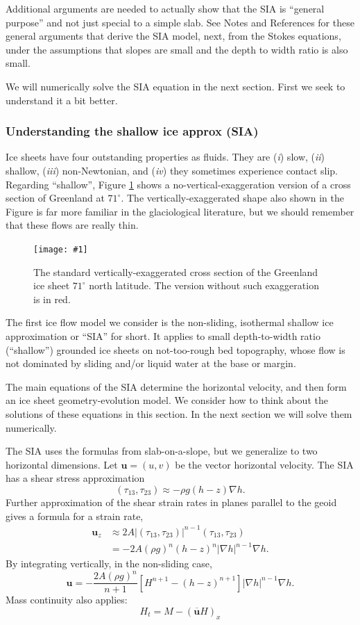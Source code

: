 \documentclass[titlepage,letterpaper,final,12pt]{scrartcl}
\newcommand{\onefig}[2]{
\begin{figure}[ht]
\centering
\texttt{[image: \#1]}
\caption{#2}
\label{fig:#1}
\end{figure}}
\begin{document}
Additional arguments are needed to actually show that the SIA is ``general purpose'' and not just special to a simple slab.  See Notes and References for these general arguments that derive the SIA model, next, from the Stokes equations, under the assumptions that slopes are small and the depth to width ratio is also small.

We will numerically solve the SIA equation in the next section.  First we seek to understand it a bit better.

\subsubsection*{Understanding the shallow ice approx (SIA)}  Ice sheets have four outstanding properties as fluids.  They are (\emph{i}) slow, (\emph{ii}) shallow,  (\emph{iii}) non-Newtonian, and  (\emph{iv}) they sometimes experience contact slip.  Regarding ``shallow'', Figure \ref{fig:green_transect} shows a no-vertical-exaggeration version of a cross section of Greenland at $71^\circ$.  The vertically-exaggerated shape also shown in the Figure is far more familiar in the glaciological literature, but we should remember that these flows are really thin.

\onefig{green_transect}{The standard vertically-exaggerated cross section of the Greenland ice sheet $71^\circ$ north latitude.  The version without such exaggeration is in red.}



The first ice flow model we consider is the non-sliding, isothermal shallow ice approximation or ``SIA'' for short.  It applies to small depth-to-width ratio (``shallow'') grounded ice sheets on not-too-rough bed topography, whose flow is not dominated by sliding and/or liquid water at the base or margin.

The main equations of the SIA determine the horizontal velocity, and then form an ice sheet geometry-evolution model.  We consider how to think about the solutions of these equations in this section.  In the next section we will solve them numerically.

The SIA uses the formulas from slab-on-a-slope, but we generalize to two horizontal dimensions.  Let $\mathbf{u} = (u,v)$ be the vector horizontal velocity.  The SIA has a shear stress approximation
	$$(\tau_{13},\tau_{23}) \approx - \rho g (h-z) \nabla h.$$
Further approximation of the shear strain rates in planes parallel to the geoid gives a formula for a strain rate,
\begin{align*}
\mathbf{u}_z &\approx 2 A |(\tau_{13},\tau_{23})|^{n-1} (\tau_{13},\tau_{23}) \\
     &= - 2 A (\rho g)^n (h-z)^n |\nabla h|^{n-1} \nabla h.
\end{align*}
By integrating vertically, in the non-sliding case,
    $$\mathbf{u} = - \frac{2 A (\rho g)^n}{n+1} \left[H^{n+1} - (h-z)^{n+1}\right] |\nabla h|^{n-1} \nabla h.$$
Mass continuity also applies:
    $$H_t = M - \left(\overline{\mathbf{u}} H\right)_x$$
\end{document}
